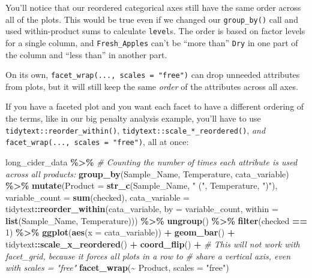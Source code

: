 \documentclass[
]{book}
\newenvironment{Shaded}{\begin{snugshade}}{\end{snugshade}}
\newcommand{\AttributeTok}[1]{\textcolor[rgb]{0.13,0.29,0.53}{#1}}
\newcommand{\CommentTok}[1]{\textcolor[rgb]{0.56,0.35,0.01}{\textit{#1}}}
\newcommand{\DecValTok}[1]{\textcolor[rgb]{0.00,0.00,0.81}{#1}}
\newcommand{\FunctionTok}[1]{\textcolor[rgb]{0.13,0.29,0.53}{\textbf{#1}}}
\newcommand{\NormalTok}[1]{#1}
\newcommand{\SpecialCharTok}[1]{\textcolor[rgb]{0.81,0.36,0.00}{\textbf{#1}}}
\newcommand{\StringTok}[1]{\textcolor[rgb]{0.31,0.60,0.02}{#1}}
\begin{document}
You'll notice that our reordered categorical axes still have the same order across all of the plots. This would be true even if we changed our \texttt{group\_by()} call and used within-product sums to calculate \texttt{level}s. The order is based on factor levels for a single column, and \texttt{Fresh\_Apples} can't be ``more than'' \texttt{Dry} in one part of the column and ``less than'' in another part.

On its own, \texttt{facet\_wrap(...,\ scales\ =\ "free")} can drop unneeded attributes from plots, but it will still keep the same \emph{order} of the attributes across all axes.

If you have a faceted plot and you want each facet to have a different ordering of the terms, like in our big penalty analysis example, you'll have to use \texttt{tidytext::reorder\_within()}, \texttt{tidytext::scale\_*\_reordered()}, \emph{and} \texttt{facet\_wrap(...,\ scales\ =\ "free")}, all at once:

\begin{Shaded}
\begin{Highlighting}[]
\NormalTok{long\_cider\_data }\SpecialCharTok{\%\textgreater{}\%}
  \CommentTok{\# Counting the number of times each attribute is used across all products:}
  \FunctionTok{group\_by}\NormalTok{(Sample\_Name, Temperature, cata\_variable) }\SpecialCharTok{\%\textgreater{}\%}
  \FunctionTok{mutate}\NormalTok{(}\AttributeTok{Product =} \FunctionTok{str\_c}\NormalTok{(Sample\_Name, }\StringTok{" ("}\NormalTok{, Temperature, }\StringTok{")"}\NormalTok{),}
         \AttributeTok{variable\_count =} \FunctionTok{sum}\NormalTok{(checked),}
         \AttributeTok{cata\_variable =}\NormalTok{ tidytext}\SpecialCharTok{::}\FunctionTok{reorder\_within}\NormalTok{(cata\_variable,}
                                                  \AttributeTok{by =}\NormalTok{ variable\_count,}
                                                  \AttributeTok{within =} \FunctionTok{list}\NormalTok{(Sample\_Name, Temperature))) }\SpecialCharTok{\%\textgreater{}\%}
  \FunctionTok{ungroup}\NormalTok{() }\SpecialCharTok{\%\textgreater{}\%}
  \FunctionTok{filter}\NormalTok{(checked }\SpecialCharTok{==} \DecValTok{1}\NormalTok{) }\SpecialCharTok{\%\textgreater{}\%}
  \FunctionTok{ggplot}\NormalTok{(}\FunctionTok{aes}\NormalTok{(}\AttributeTok{x =}\NormalTok{ cata\_variable)) }\SpecialCharTok{+}
  \FunctionTok{geom\_bar}\NormalTok{() }\SpecialCharTok{+}
\NormalTok{  tidytext}\SpecialCharTok{::}\FunctionTok{scale\_x\_reordered}\NormalTok{() }\SpecialCharTok{+}
  \FunctionTok{coord\_flip}\NormalTok{() }\SpecialCharTok{+}
  \CommentTok{\# This will not work with facet\_grid, because it forces all plots in a row to}
  \CommentTok{\# share a vertical axis, even with scales = "free"}
  \FunctionTok{facet\_wrap}\NormalTok{(}\SpecialCharTok{\textasciitilde{}}\NormalTok{ Product,}
             \AttributeTok{scales =} \StringTok{"free"}\NormalTok{)}
\end{Highlighting}
\end{Shaded}
\end{document}
